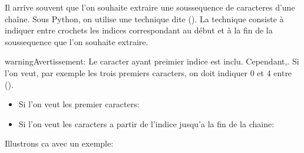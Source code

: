 \documentclass[letterpaper,10pt,french]{sphinxmanual}
\begin{document}
\sphinxAtStartPar
Il arrive souvent que l’on souhaite extraire une sous\sphinxhyphen{}sequence de caracteres d’une chaîne. Sous Python, on utilise une technique dite  (). La technique consiste à indiquer entre crochets \sphinxcode{\sphinxupquote{{[}{]}}} les indices correspondant au
début et à la fin de la sous\sphinxhyphen{}sequence que l’on souhaite extraire.

\begin{sphinxadmonition}{warning}{Avertissement:}
\sphinxAtStartPar
Le caracter ayant preimier indice est inclu. Cependant,. Si l’on veut, par exemple les trois premiers caracters, on doit indiquer 0 et 4 entre \sphinxcode{\sphinxupquote{{[}{]}}} (\sphinxcode{\sphinxupquote{{[}0:4{]}}}).
\begin{itemize}
\item {} 
\sphinxAtStartPar
Si l’on veut les  premier caracters: \sphinxcode{\sphinxupquote{{[}:n+1{]}}}

\item {} 
\sphinxAtStartPar
Si l’on veut les caracters a partir de l’indice  jusqu’a la fin de la chaine: \sphinxcode{\sphinxupquote{{[}n:{]}}}

\end{itemize}
\end{sphinxadmonition}

\sphinxAtStartPar
Illustrons ca avec un exemple:

\begin{sphinxVerbatim}[commandchars=\\\{\}]
  

\PYG{p}{[}\PYG{p}{]}
\PYG{p}{[}\PYG{p}{]}
\PYG{p}{[}\PYG{p}{]}

\PYG{p}{[}\PYG{p}{]}

\PYG{p}{[}\PYG{p}{]}

\PYG{p}{[}\PYG{p}{]}

\PYG{p}{[}\PYG{p}{]}
\end{sphinxVerbatim}
\end{document}
